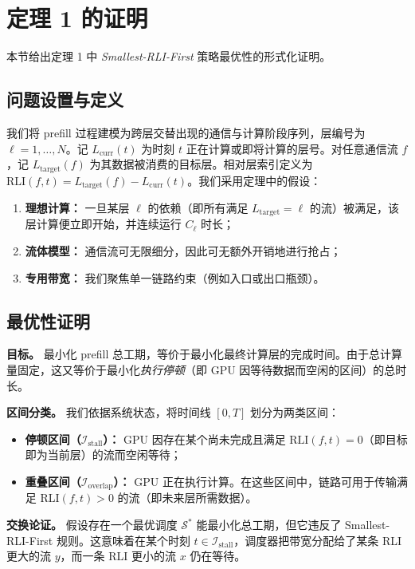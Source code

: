 \appendix

\section{定理 1 的证明}\label{sec:appendix:The1}

本节给出定理 1 中 \emph{Smallest-RLI-First} 策略最优性的形式化证明。

\subsection{问题设置与定义}
我们将 prefill 过程建模为跨层交替出现的通信与计算阶段序列，层编号为 $\ell = 1, \dots, N$。记 $L_{\text{curr}}(t)$ 为时刻 $t$ 正在计算或即将计算的层号。对任意通信流 $f$，记 $L_{\text{target}}(f)$ 为其数据被消费的目标层。相对层索引定义为 $\text{RLI}(f, t) = L_{\text{target}}(f) - L_{\text{curr}}(t)$。我们采用定理中的假设：
\begin{enumerate}
\item[(i)] \textbf{理想计算：} 一旦某层 $\ell$ 的依赖（即所有满足 $L_{\text{target}} = \ell$ 的流）被满足，该层计算便立即开始，并连续运行 $C_\ell$ 时长；
\item[(ii)] \textbf{流体模型：} 通信流可无限细分，因此可无额外开销地进行抢占；
\item[(iii)] \textbf{专用带宽：} 我们聚焦单一链路约束（例如入口或出口瓶颈）。
\end{enumerate}

\subsection{最优性证明}
\textbf{目标。} 最小化 prefill 总工期，等价于最小化最终计算层的完成时间。由于总计算量固定，这又等价于最小化\emph{执行停顿}（即 GPU 因等待数据而空闲的区间）的总时长。

\textbf{区间分类。} 我们依据系统状态，将时间线 $[0, T]$ 划分为两类区间：
\begin{itemize}
\item \textbf{停顿区间（$\mathcal{I}_{\text{stall}}$）：} GPU 因存在某个尚未完成且满足 $\text{RLI}(f, t) = 0$（即目标即为当前层）的流而空闲等待；
\item \textbf{重叠区间（$\mathcal{I}_{\text{overlap}}$）：} GPU 正在执行计算。在这些区间中，链路可用于传输满足 $\text{RLI}(f, t) > 0$ 的流（即未来层所需数据）。
\end{itemize}

\textbf{交换论证。}
假设存在一个最优调度 $\mathcal{S}^*$ 能最小化总工期，但它违反了 Smallest-RLI-First 规则。这意味着在某个时刻 $t \in \mathcal{I}_{\text{stall}}$，调度器把带宽分配给了某条 RLI 更大的流 $y$，而一条 RLI 更小的流 $x$ 仍在等待。

